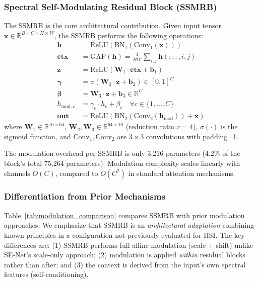 \documentclass[conference]{IEEEtran}
\begin{document}
\subsubsection{Spectral Self-Modulating Residual Block (SSMRB)}

The SSMRB is the core architectural contribution. Given input tensor $\mathbf{x} \in \mathbb{R}^{B \times C \times H \times W}$, the SSMRB performs the following operations:
\begin{align}
\mathbf{h} &= \text{ReLU}(\text{BN}_1(\text{Conv}_1(\mathbf{x}))) \label{eq:ssmrb1} \\
\mathbf{ctx} &= \text{GAP}(\mathbf{h}) = \frac{1}{HW} \sum_{i,j} \mathbf{h}(:,:,i,j) \label{eq:ssmrb2} \\
\mathbf{z} &= \text{ReLU}(\mathbf{W}_1 \cdot \mathbf{ctx} + \mathbf{b}_1) \label{eq:ssmrb3} \\
\bm{\gamma} &= \sigma(\mathbf{W}_2 \cdot \mathbf{z} + \mathbf{b}_2) \in [0,1]^C \label{eq:ssmrb4} \\
\bm{\beta} &= \mathbf{W}_3 \cdot \mathbf{z} + \mathbf{b}_3 \in \mathbb{R}^C \label{eq:ssmrb5} \\
h_{\text{mod},c} &= \gamma_c \cdot h_c + \beta_c \quad \forall c \in \{1,\ldots,C\} \label{eq:ssmrb6} \\
\mathbf{out} &= \text{ReLU}(\text{BN}_2(\text{Conv}_2(\mathbf{h}_{\text{mod}})) + \mathbf{x}) \label{eq:ssmrb7}
\end{align}
where $\mathbf{W}_1 \in \mathbb{R}^{16 \times 64}$, $\mathbf{W}_2, \mathbf{W}_3 \in \mathbb{R}^{64 \times 16}$ (reduction ratio $r=4$), $\sigma(\cdot)$ is the sigmoid function, and $\text{Conv}_1, \text{Conv}_2$ are $3\!\times\!3$ convolutions with padding=1.

The modulation overhead per SSMRB is only 3,216 parameters (4.2\% of the block's total 75,264 parameters). Modulation complexity scales linearly with channels $O(C)$, compared to $O(C^2)$ in standard attention mechanisms.

\subsubsection{Differentiation from Prior Mechanisms}

Table~\ref{tab:modulation_comparison} compares SSMRB with prior modulation approaches. We emphasize that SSMRB is an \textit{architectural adaptation} combining known principles in a configuration not previously evaluated for HSI. The key differences are: (1) SSMRB performs full affine modulation (scale + shift) unlike SE-Net's scale-only approach; (2) modulation is applied \textit{within} residual blocks rather than after; and (3) the context is derived from the input's own spectral features (self-conditioning).
\end{document}

